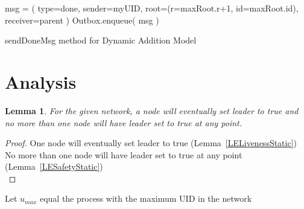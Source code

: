 \documentclass[english]{article}
\newtheorem{lemma}[theorem]{Lemma}
\begin{document}
\begin{algorithm}
  msg = ( type=done, sender=myUID, root=(r=maxRoot.r+1, id=maxRoot.id), receiver=parent ) \;
  Outbox.enqueue( msg ) \;
  \caption{sendDoneMsg method for Dynamic Addition Model}
\end{algorithm}

\section{Analysis}

\begin{lemma}
\label{LeaderElectionStatic}
For the given network, a node will eventually set leader to true and no more than one node will have leader set to true at any point. 
\end{lemma}
\begin{proof}
One node will eventually set leader to true (Lemma~\ref{LELivenessStatic}) \\
No more than one node will have leader set to true at any point (Lemma~\ref{LESafetyStatic}) \\
\end{proof}

\begin{definition}
Let $u_{max}$ equal the process with the maximum UID in the network  \\
\end{definition}
\end{document}
